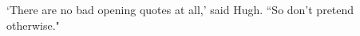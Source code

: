 \documentclass{article}
\begin{document}
`There are no bad opening quotes at all,' said Hugh. ``So don't pretend otherwise."
\end{document}
